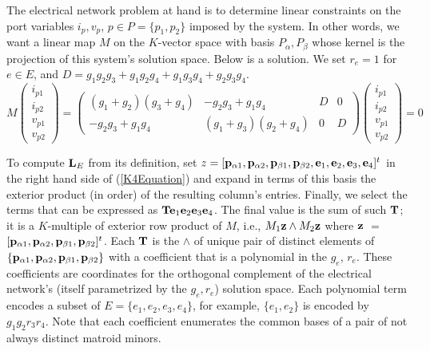The electrical network problem at hand is to determine linear constraints on the
port variables $i_p, v_p$, $p\in P = \{p_1, p_2\}$ imposed by the system.  In other words,
we want a linear map $M$ on the $K$-vector space with basis $P_\alpha, P_\beta$ whose kernel
is the projection of this system's solution space.
Below is a solution.
We set $r_e=1$ for $e\in E$, and $D=g_{1} g_{2} g_{3} + g_{1} g_{2} g_{4} + g_{1} g_{3} g_{4} + g_{2} g_{3} g_{4}$.
\begin{equation}\label{K4Soln}
M\left(\begin{array}{c} i_{p1} \\ i_{p2} \\ v_{p1} \\ v_{p2}
\end{array}\right) =
\left(\begin{array}{cccc}
{\left(g_{1} + g_{2}\right)} {\left(g_{3} + g_{4}\right)} & -g_{2} g_{3} + g_{1} g_{4} & D & 0 \\
-g_{2} g_{3} + g_{1} g_{4} & {\left(g_{1} + g_{3}\right)} {\left(g_{2} + g_{4}\right)} & 0 & D
\end{array}\right)
\left(\begin{array}{c} i_{p1} \\ i_{p2} \\ v_{p1} \\ v_{p2}
\end{array}\right) = 0
\end{equation}


To compute $\mathbf{L}_E$ from its definition, set 
$z=[\mathbf{p}_{\alpha 1},\mathbf{p}_{\alpha 2},\mathbf{p}_{\beta 1},\mathbf{p}_{\beta 2},
  \mathbf{e}_1,  \mathbf{e}_2,  \mathbf{e}_3,  \mathbf{e}_4]^t$
in the right hand side of (\ref{K4Equation}) 
and expand in terms of this basis
the exterior product (in order) of the resulting column's entries.
Finally, we select
the terms that can be expressed as
$\mathbf{T}\mathbf{e}_1\mathbf{e}_2\mathbf{e}_3\mathbf{e}_4$.
The final
value is the sum of such $\mathbf{T}$; it is a $K$-multiple of exterior
row product of $M$, i.e., $M_1\mathbf{z}\wedge M_2\mathbf{z}$ where
$\mathbf{z}$ $=$ 
$[\mathbf{p}_{\alpha 1},\mathbf{p}_{\alpha 2},\mathbf{p}_{\beta 1},\mathbf{p}_{\beta 2}]^t$.
Each $\mathbf{T}$ is the $\wedge$ of unique pair of distinct elements
of $\{\mathbf{p}_{\alpha 1}, \mathbf{p}_{\alpha 2}, \mathbf{p}_{\beta 1}, \mathbf{p}_{\beta 2}\}$
with a coefficient that is a polynomial in the 
$g_e$, $r_e$.  These coefficients are \Plucker coordinates
for the orthogonal complement of the electrical network's
(itself parametrized by the $g_e, r_e$) solution space.
Each polynomial
term encodes a subset of $E=\{e_1, e_2, e_3, e_4\}$, for example, $\{e_1, e_2\}$ is encoded
by $g_1g_2r_3r_4$. Note that each coefficient enumerates
the common bases of a pair of not always distinct matroid minors.


